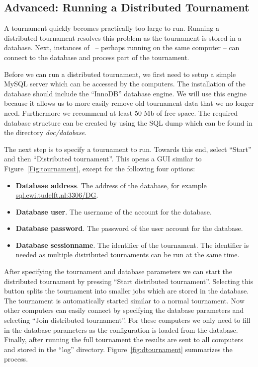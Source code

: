 \documentclass[]{article}
\begin{document}
\subsection{Advanced: Running a Distributed Tournament}
A tournament quickly becomes practically too large to run. Running a distributed tournament resolves this problem as the tournament is stored in a database. Next, instances of \Genius~-- perhaps running on the same computer -- can connect to the database and process part of the tournament.

Before we can run a distributed tournament, we first need to setup a simple MySQL server which can be accessed by the computers. The installation of the database should include the ``InnoDB'' database engine. We will use this engine because it allows us to more easily remove old tournament data that we no longer need. Furthermore we recommend at least 50 Mb of free space. The required database structure can be created by using the SQL dump which can be found in the directory \textit{doc/database}.

The next step is to specify a tournament to run. Towards this end, select ``Start'' and then ``Distributed tournament''. This opens a GUI similar to Figure~\ref{Fig:tournament}, except for the following four options:

\begin{itemize}
	\item \textbf{Database address}. The address of the database, for example \url{sql.ewi.tudelft.nl:3306/DG}.
	\item \textbf{Database user}. The username of the account for the database.
	\item \textbf{Database password}. The password of the user account for the database.
	\item \textbf{Database sessionname}. The identifier of the tournament. The identifier is needed as multiple distributed tournaments can be run at the same time.
\end{itemize}

After specifying the tournament and database parameters we can start the distributed tournament by pressing ``Start distributed tournament''. Selecting this button splits the tournament into smaller jobs which are stored in the database. The tournament is automatically started similar to a normal tournament. Now other computers can easily connect by specifying the database parameters and selecting ``Join distributed tournament''. For these computers we only need to fill in the database parameters as the configuration is loaded from the database. Finally, after running the full tournament the results are sent to all computers and stored in the ``log'' directory. Figure~\ref{fig:dtournament} summarizes the process.
\end{document}
